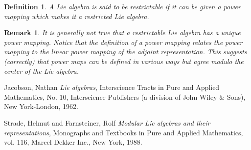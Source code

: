 \documentclass[12pt]{article}
\newtheorem{defn}[thm]{Definition}
\newtheorem{remark}[thm]{Remark}
\begin{document}
\begin{defn}
A Lie algebra is said to be \emph{restrictable} if it can be given 
a power mapping which makes it a restricted Lie algebra.
\end{defn}

\begin{remark}
It is generally not true that a restrictable Lie algebra has a unique 
power mapping.  Notice that the definition of a power mapping relates
the power mapping to the linear power mapping of the adjoint representation.
This suggests (correctly) that power maps can be defined in various ways
but agree modulo the center of the Lie algebra.
\end{remark}

Jacobson, Nathan \emph{Lie algebras}, Interscience Tracts in Pure and Applied Mathematics, No. 10, Interscience Publishers (a division of John Wiley \& Sons),
              New York-London, 1962.

Strade, Helmut and Farnsteiner, Rolf \emph{Modular {L}ie algebras and their representations}, Monographs and Textbooks in Pure and Applied Mathematics,
vol. 116, Marcel Dekker Inc., New York, 1988.

\end{document}
